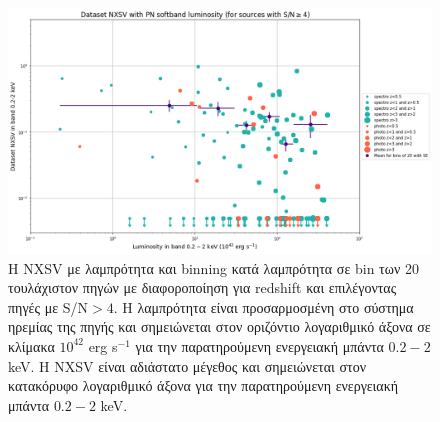  \begin{figure}  \includegraphics[width=1.12\linewidth]{Figures/NXSVclassic_sn4.png} \caption{ Η \textlatin{NXSV} με λαμπρότητα και \textlatin{binning} κατά λαμπρότητα σε \textlatin{bin} των 20 τουλάχιστον πηγών με διαφοροποίηση για \textlatin{redshift} και επιλέγοντας πηγές με \textlatin{S/N}$>4$. Η λαμπρότητα είναι προσαρμοσμένη στο σύστημα ηρεμίας της πηγής και σημειώνεται στον οριζόντιο λογαριθμικό άξονα σε κλίμακα $10^{42}$ \textlatin{erg  s}$^{-1}$ για την παρατηρούμενη ενεργειακή μπάντα $0.2-2$ \textlatin{keV}. Η \textlatin{NXSV} είναι αδιάστατο μέγεθος και σημειώνεται στον κατακόρυφο λογαριθμικό άξονα για την παρατηρούμενη ενεργειακή μπάντα $0.2-2$ \textlatin{keV}.} \label{fig:NXSV_classic_sn4}
  \end{figure}
 

